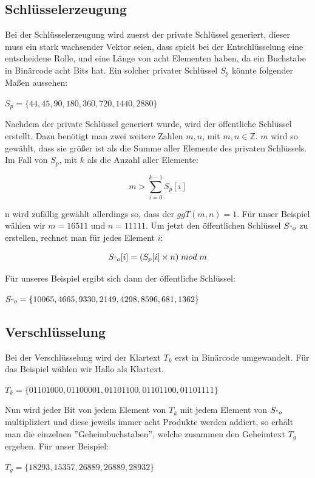 \documentclass[a4paper,12pt,titlepage]{article}
\begin{document}
\subsection{Schlüsselerzeugung}
Bei der Schlüsselerzeugung wird zuerst der private Schlüssel generiert, dieser muss ein stark wachsender Vektor seien, dass spielt bei der Entschlüsselung eine entscheidene Rolle, und eine Länge von acht Elementen haben, da ein Buchstabe in Binärcode acht Bits hat. Ein solcher privater Schlüssel $S_p$ könnte folgender Maßen aussehen:
\begin{center}
$S_p=\{44,45,90,180,360,720,1440,2880\}$
\end{center}
Nachdem der private Schlüssel generiert wurde, wird der öffentliche Schlüssel erstellt. Dazu benötigt man zwei weitere Zahlen $m,n$, mit $m,n \in \mathbb{Z}$. $m$ wird so gewählt, dass sie größer ist als die Summe aller Elemente des privaten Schlüssels. Im Fall von $S_p$, mit $k$ als die Anzahl aller Elemente:
\begin{center}
\[m > \sum_{i=0}^{k-1} S_p[i]\]
\end{center}
n wird zufällig gewählt allerdings so, dass der $ggT(m, n) = 1$.
Für unser Beispiel wählen wir $m = 16511$ und $n = 11111$. Um jetzt den öffentlichen Schlüssel $S_{"o}$ zu erstellen, rechnet man für jedes Element $i$:
\begin{center}
\[S_{"o}[i]=(S_p[i] \times n)\; mod \; m\]
\end{center}
Für unseres Beispiel ergibt sich dann der öffentliche Schlüssel:
\begin{center}
$S_{"o}=\{10065,4665,9330,2149,4298,8596,681,1362\}$
\end{center}

\subsection{Verschlüsselung}
Bei der Verschlüsselung wird der Klartext $T_k$ erst in Binärcode umgewandelt. Für das Beispiel wählen wir Hallo als Klartext.
\begin{center}
$T_k = \{01101000, 01100001, 01101100, 01101100, 01101111\}$
\end{center}
Nun wird jeder Bit von jedem Element von $T_k$ mit jedem Element von $S_{"o}$ multipliziert und diese jeweils immer acht Produkte werden addiert, so erhält man die einzelnen ''Geheimbuchstaben'', welche zusammen den Geheimtext $T_g$ ergeben.
Für unser Beispiel:
\begin{center}
$T_g=\{18293,15357,26889,26889,28932\}$
\end{center}
\end{document}
